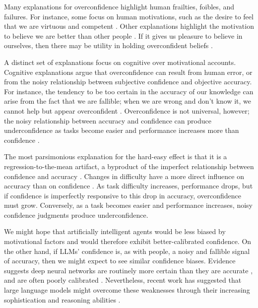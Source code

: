 \documentclass{article}
\begin{document}
Many explanations for overconfidence highlight human frailties, foibles, and failures. For instance, some focus on human motivations, such as the desire to feel that we are virtuous and competent \citep{Kruger_Dunning_1999, Huffman_Raymond_Shvets_2022, Drobner_Goerg_2024}. Other explanations highlight the motivation to believe we are better than other people \citep{Brown_2012,Epley_Dunning_2000}. If it gives us pleasure to believe in ourselves, then there may be utility in holding overconfident beliefs \citep{Koszegi_2006}.  

A distinct set of explanations focus on cognitive over motivational accounts. Cognitive explanations argue that overconfidence can result from human error, or from the noisy relationship between subjective confidence and objective accuracy. For instance, the tendency to be too certain in the accuracy of our knowledge can arise from the fact that we are fallible; when we are wrong and don't know it, we cannot help but appear overconfident \citep{Moore_2023, Walters_2017}. Overconfidence is not universal, however; the noisy relationship between accuracy and confidence can produce underconfidence as tasks become easier and performance increases more than confidence \citep{Juslin_1993}. 

The most parsimonious explanation for the hard-easy effect is that it is a regression-to-the-mean artifact, a byproduct of the imperfect relationship between confidence and accuracy \citep{Boundy-Singer_Ziemba_Goris_2023, Krueger_Mueller_2002}. Changes in difficulty have a more direct influence on accuracy than on confidence \citep{Erev_1994}. As task difficulty increases, performance drops, but if confidence is imperfectly responsive to this drop in accuracy, overconfidence must grow. Conversely, as a task becomes easier and performance increases, noisy confidence judgments produce underconfidence. 

We might hope that artificially intelligent agents would be less biased by motivational factors and would therefore exhibit better-calibrated confidence. On the other hand, if LLMs' confidence is, as with people, a noisy and fallible signal of accuracy, then we might expect to see similar confidence biases. Evidence suggests deep neural networks are routinely more certain than they are accurate \citep{Oelrich_2020,Abdar_2021}, and are often poorly calibrated \citep{guo2017calibrationmodernneuralnetworks, xu2025languagemodelsmirrorhuman}. Nevertheless, recent work has suggested that large language models might overcome these weaknesses through their increasing sophistication and reasoning abilities \citep{Kadavath_2022, Xiao_2025,Leng_2025,chhikara2025,confTunerYiboLi,Finlay_2026}.
\end{document}
